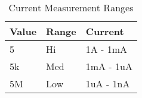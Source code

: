 \begin{table}[ht!]
\centering
\begin{tabular}{|l|l|l|}
\hline
Value & Range & Current   \\ \hline
5     & Hi    & 1A  - 1mA \\ \hline
5k    & Med   & 1mA - 1uA \\ \hline
5M    & Low   & 1uA - 1nA \\ \hline
\end{tabular}
\caption{Current Measurement Ranges}
\label{table:imeas_table}
\end{table}
